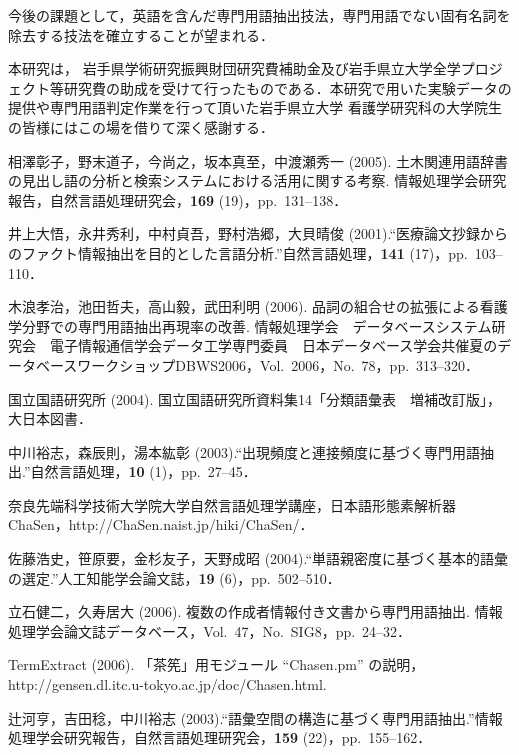 \documentclass[japanese]{jnlp_1.4}
\begin{document}
今後の課題として，英語を含んだ専門用語抽出技法，専門用語でない固有名詞を除去する技法を確立することが望まれる．

\acknowledgment

本研究は，
岩手県学術研究振興財団研究費補助金及び岩手県立大学全学プロジェクト等研究費の助成を受けて行ったものである．本研究で用いた実験データの提供や専門用語判定作業を行って頂いた岩手県立大学 
看護学研究科の大学院生の皆様にはこの場を借りて深く感謝する．




\begin{thebibliography}{}

\item
相澤彰子，野末道子，今尚之，坂本真至，中渡瀬秀一 (2005). 土木関連用語辞書の見出し語の分析と検索システムにおける活用に関する考察. 情報処理学会研究報告，自然言語処理研究会，\textbf{169} (19)，pp.~131--138．

\item
井上大悟，永井秀利，中村貞吾，野村浩郷，大貝晴俊 (2001).“医療論文抄録からのファクト情報抽出を目的とした言語分析.”自然言語処理，\textbf{141} (17)，pp.~103--110．

\item
木浪孝治，池田哲夫，高山毅，武田利明 (2006). 品詞の組合せの拡張による看護学分野での専門用語抽出再現率の改善. 情報処理学会　データベースシステム研究会　電子情報通信学会データ工学専門委員　日本データベース学会共催夏のデータベースワークショップDBWS2006，Vol.~2006，No.~78，pp.~313--320．

\item
国立国語研究所 (2004). 国立国語研究所資料集14「分類語彙表　増補改訂版」，大日本図書．

\item
中川裕志，森辰則，湯本紘彰 (2003).“出現頻度と連接頻度に基づく専門用語抽出.”自然言語処理，\textbf{10} (1)，pp.~27--45．

\item
奈良先端科学技術大学院大学自然言語処理学講座，日本語形態素解析器 ChaSen，http://ChaSen.naist.jp/hiki/ChaSen/．

\item
佐藤浩史，笹原要，金杉友子，天野成昭 (2004).“単語親密度に基づく基本的語彙の選定.”人工知能学会論文誌，\textbf{19} (6)，pp.~502--510．

\item
立石健二，久寿居大 (2006). 複数の作成者情報付き文書から専門用語抽出. 情報処理学会論文誌データベース，Vol.~47，No.~SIG8，pp.~24--32．

\item
TermExtract (2006). 「茶筅」用モジュール ``Chasen.pm'' の説明，http://gensen.dl.itc.u-tokyo.ac.jp/doc/Chasen.html.

\item
辻河亨，吉田稔，中川裕志 (2003).“語彙空間の構造に基づく専門用語抽出.”情報処理学会研究報告，自然言語処理研究会，\textbf{159} (22)，pp.~155--162．

\end{thebibliography}
\end{document}
